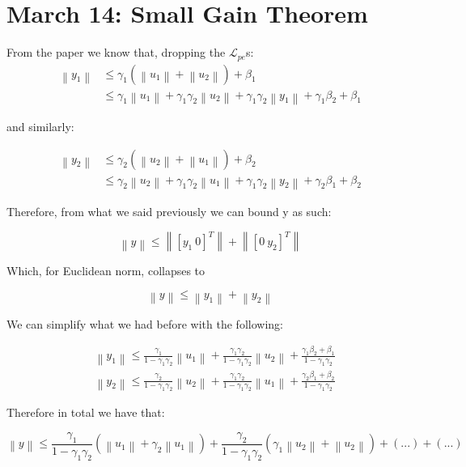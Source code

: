 \documentclass[11pt]{article}
\newcommand{\norm}[1]{\left\lVert#1\right\rVert}
\begin{document}
\section*{\textbf{March 14: Small Gain Theorem}}

From the paper we know that, dropping the $\mathcal{L}_{pe}$s:
\begin{align}
 \norm{y_1} & \leq \gamma_1 ( \norm{u_1} + \norm{u_2} ) + \beta_1 \\
 			& \leq \gamma_1 \norm{u_1} + \gamma_1 \gamma_2 \norm{u_2} + \gamma_1 \gamma_2 \norm{y_1} + \gamma_1 \beta_2 + \beta_1
\end{align}

and similarly: 

\begin{align}
 \norm{y_2} & \leq \gamma_2 ( \norm{u_2} + \norm{u_1} ) + \beta_2 \\
 			& \leq \gamma_2 \norm{u_2} + \gamma_1 \gamma_2 \norm{u_1} + \gamma_1 \gamma_2 \norm{y_2} + \gamma_2 \beta_1 + \beta_2
\end{align}

Therefore, from what we said previously we can bound y as such:

\begin{equation}
	\norm{y} \leq \norm{ [ y_1 \  0 ]^T} + \norm{ [ 0 \  y_2 ]^T} 
\end{equation}

Which, for Euclidean norm, collapses to

\begin{equation}
	\norm{y} \leq \norm{ y_1 } + \norm{y_2} 
\end{equation}

We can simplify what we had before with the following: 


\begin{align}
& \norm{y_1} \leq \frac{\gamma_1}{1-\gamma_1\gamma_2}\norm{u_1} + \frac{\gamma_1\gamma_2}{1-\gamma_1\gamma_2}\norm{u_2} + \frac{\gamma_1 \beta_2 + \beta_1}{1-\gamma_1\gamma_2} \\
& \norm{y_2} \leq \frac{\gamma_2}{1-\gamma_1\gamma_2}\norm{u_2} + \frac{\gamma_1\gamma_2}{1-\gamma_1\gamma_2}\norm{u_1} + \frac{\gamma_2 \beta_1 + \beta_2}{1-\gamma_1\gamma_2}
\end{align}

Therefore in total we have that: 

\begin{equation}
	\norm{y} \leq \frac{\gamma_1}{1-\gamma_1\gamma_2}(\norm{u_1} + \gamma_2 \norm{u_1}) + \frac{\gamma_2}{1-\gamma_1\gamma_2}(\gamma_1\norm{u_2} + \norm{u_2} ) + (...) + (...)
\end{equation}
\end{document}
